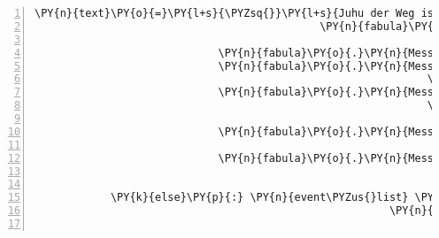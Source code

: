 \begin{Verbatim}[commandchars=\\\{\},numbers=left,firstnumber=1,stepnumber=1]
                                                              \PY{n}{text}\PY{o}{=}\PY{l+s}{\PYZsq{}}\PY{l+s}{Juhu der Weg ist frei!}\PY{l+s}{\PYZsq{}}\PY{p}{)}\PY{p}{,}
                                             \PY{n}{fabula}\PY{o}{.}\PY{n}{MovesToEvent}\PY{p}{(}\PY{n}{identifier}\PY{o}{=}\PY{l+s}{\PYZsq{}}\PY{l+s}{guardian}\PY{l+s}{\PYZsq{}}\PY{p}{,}
                                                                 \PY{n}{location}\PY{o}{=}\PY{p}{(}\PY{l+m+mi}{0}\PY{p}{,} \PY{l+m+mi}{2}\PY{p}{)}\PY{p}{)}\PY{p}{]}\PY{p}{)}\PY{p}{,}
                             \PY{n}{fabula}\PY{o}{.}\PY{n}{Message}\PY{p}{(}\PY{p}{[}\PY{n}{fabula}\PY{o}{.}\PY{n}{DeleteEvent}\PY{p}{(}\PY{l+s}{\PYZsq{}}\PY{l+s}{guardian}\PY{l+s}{\PYZsq{}}\PY{p}{)}\PY{p}{]}\PY{p}{)}\PY{p}{,}
                             \PY{n}{fabula}\PY{o}{.}\PY{n}{Message}\PY{p}{(}\PY{p}{[}\PY{n}{fabula}\PY{o}{.}\PY{n}{SaysEvent}\PY{p}{(}\PY{n}{identifier}\PY{o}{=}\PY{n}{ID\PYZus{}CASSANDRA}\PY{p}{,}
                                                              \PY{n}{text}\PY{o}{=}\PY{l+s}{\PYZsq{}}\PY{l+s}{Wollen wir dann gemeinsam weiter ziehen?}\PY{l+s}{\PYZsq{}}\PY{p}{)}\PY{p}{]}\PY{p}{)}\PY{p}{,}
                             \PY{n}{fabula}\PY{o}{.}\PY{n}{Message}\PY{p}{(}\PY{p}{[}\PY{n}{fabula}\PY{o}{.}\PY{n}{SaysEvent}\PY{p}{(}\PY{n}{identifier}\PY{o}{=}\PY{n}{ID\PYZus{}KUNI}\PY{p}{,}
                                                              \PY{n}{text}\PY{o}{=}\PY{l+s}{\PYZsq{}}\PY{l+s}{Sehr gerne! Das hat ja bisher auch ausgezeichnet }\PY{l+s}{\PYZsq{}}
                                                                   \PY{l+s}{\PYZsq{}}\PY{l+s}{geklappt!}\PY{l+s}{\PYZsq{}}\PY{p}{)}\PY{p}{]}\PY{p}{)}\PY{p}{,}
                             \PY{n}{fabula}\PY{o}{.}\PY{n}{Message}\PY{p}{(}\PY{p}{[}\PY{n}{fabula}\PY{o}{.}\PY{n}{PerceptionEvent}\PY{p}{(}\PY{n}{identifier}\PY{o}{=}\PY{n}{ID\PYZus{}KUNI}\PY{p}{,}
                                                                    \PY{n}{perception}\PY{o}{=}\PY{l+s}{\PYZsq{}}\PY{l+s}{ENDE...}\PY{l+s}{\PYZsq{}}\PY{p}{)}\PY{p}{]}\PY{p}{)}\PY{p}{,}
                             \PY{n}{fabula}\PY{o}{.}\PY{n}{Message}\PY{p}{(}\PY{p}{[}\PY{n}{fabula}\PY{o}{.}\PY{n}{PerceptionEvent}\PY{p}{(}\PY{n}{identifier}\PY{o}{=}\PY{n}{ID\PYZus{}CASSANDRA}\PY{p}{,}
                                                                    \PY{n}{perception}\PY{o}{=}\PY{l+s}{\PYZsq{}}\PY{l+s}{ENDE...}\PY{l+s}{\PYZsq{}}\PY{p}{)}\PY{p}{]}\PY{p}{)}\PY{p}{]}

            \PY{k}{else}\PY{p}{:} \PY{n}{event\PYZus{}list} \PY{o}{+}\PY{o}{=} \PY{p}{[}\PY{n}{fabula}\PY{o}{.}\PY{n}{PerceptionEvent}\PY{p}{(}\PY{n}{identifier}\PY{o}{=}\PY{n}{ID\PYZus{}KUNI}\PY{p}{,}
                                                        \PY{n}{perception}\PY{o}{=}\PY{l+s}{\PYZsq{}}\PY{l+s}{Cassandra möchte bestimmt dabei sein...}\PY{l+s}{\PYZsq{}}\PY{p}{)}\PY{p}{]}


\end{Verbatim}
